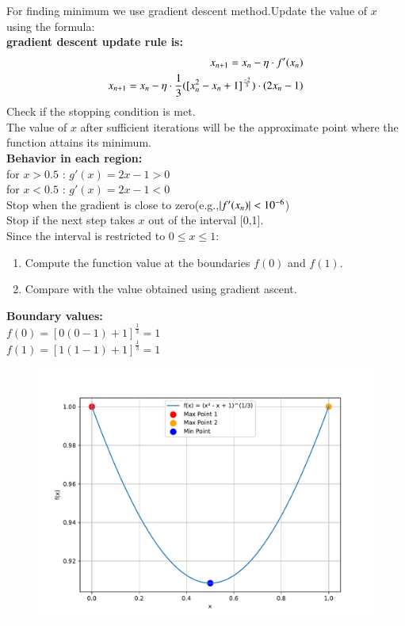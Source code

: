 \documentclass[journal]{IEEEtran}
\begin{document}
For finding minimum we use gradient descent method.Update the value of $x$ using the formula:\\
\textbf{gradient descent update rule is:}
\begin{align}
  x_{n+1} = x_n - \eta \cdot f'(x_n)\\
x_{n+1} = x_n - \eta \cdot \frac{1}{3}([x_n^2-x_n+1]^{\frac{-2}{3}})\cdot\left(2x_n-1\right)
\end{align}
Check if the stopping condition is met.\\
The value of $x$ after sufficient iterations will be the approximate point where the function attains its minimum.\\
\textbf{Behavior in each region:}\\
for $x>0.5$ : $g'(x) = 2x - 1>0$\\
for $x<0.5$ : $g'(x) = 2x - 1<0$\\
Stop when the gradient is close to zero(e.g.,$\left\vert f'(x_n)\right\vert< 10^{-6}$)\\
Stop if the next step takes $x$ out of the interval [0,1].\\
Since the interval is restricted to $0\leq x \leq 1$:\\
\begin{enumerate}
    \item Compute the function value at the boundaries $f(0)$ and $f(1)$.
    \item Compare with the value obtained using gradient ascent.
\end{enumerate}
\textbf{Boundary values:}\\
$f(0) = [0(0-1)+1]^{\frac{1}{3}} = 1$\\
$f(1) = [1(1-1)+1]^{\frac{1}{3}} = 1$
\begin{figure}[h!]
   \centering
   \includegraphics[width=\columnwidth]{figs/fig.pdf}
\end{figure}
\end{document}

